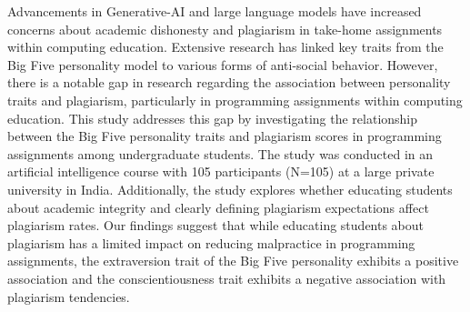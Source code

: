 Advancements in Generative-AI and large language models have increased concerns about academic dishonesty and plagiarism in take-home assignments within computing education. Extensive research has linked key traits from the Big Five personality model to various forms of anti-social behavior. However, there is a notable gap in research regarding the association between personality traits and plagiarism, particularly in programming assignments within computing education. This study addresses this gap by investigating the relationship between the Big Five personality traits and plagiarism scores in programming assignments among undergraduate students. The study was conducted in an artificial intelligence course with 105 participants (N=105) at a large private university in India. Additionally, the study explores whether educating students about academic integrity and clearly defining plagiarism expectations affect plagiarism rates. Our findings suggest that while educating students about plagiarism has a limited impact on reducing malpractice in programming assignments, the extraversion trait of the Big Five personality exhibits a positive association and the conscientiousness trait exhibits a negative association with plagiarism tendencies.